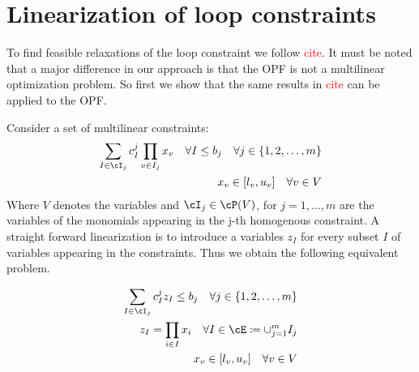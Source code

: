 \documentclass{article}
\begin{document}
\section{Linearization of loop constraints}

To find feasible relaxations of the loop constraint we follow \textcolor{red}{cite}. It must be noted that a major difference in our approach is that the OPF is not a multilinear optimization problem. So first we show that the same results in \textcolor{red}{cite} can be applied to the OPF.

Consider a set of multilinear constraints:
\begin{align}
  \sum_{I \in \cI_j}c_I^j\prod_{v \in I_j} x_v \quad \forall I \leq b_j \quad \forall j \in \{1,2,\ldots, m\} \\
  x_v \in [l_v,u_v] \quad \forall v \in V
\end{align}
Where \(V\) denotes the variables and \(\cI_j \in \cP(V)\), for \(j = 1,\ldots,m\) are the variables of the monomials appearing in the j-th homogenous constraint.
A straight forward linearization is to introduce a variables \(z_I\) for every subset \(I\) of variables appearing in the constraints. Thus we obtain the following equivalent problem.

\begin{align}
  \sum_{I \in \cI_j}c_I^jz_I \leq b_j \quad \forall j \in \{1,2,\ldots, m\} \label{constr: linearized multilinear constraint} \\
  z_I = \prod_{i \in I} x_i \quad \forall I \in \cE \coloneqq \cup_{j=1}^m I_j \\
  x_v \in [l_v,u_v] \quad \forall v \in V
\end{align}
\end{document}

